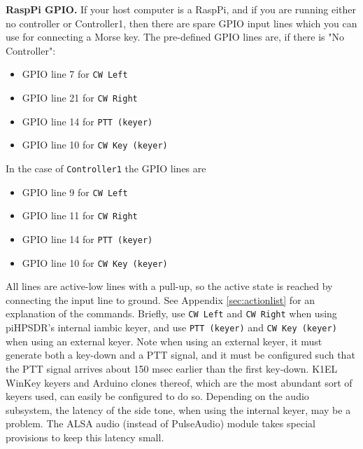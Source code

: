 \documentclass[12pt]{book}
\def\bltt#1{\texttt{\color{blue}#1}}
\begin{document}
\textbf{RaspPi GPIO.} If your host computer is a RaspPi, and if you are running either no controller
or Controller1, then there are spare GPIO input lines which you can use for connecting a Morse
key. The pre-defined GPIO lines are, if there is "No Controller":

\begin{itemize}
\item{GPIO line 7 for \bltt{CW Left}}
\item{GPIO line 21 for \bltt{CW Right}}
\item{GPIO line 14 for \bltt{PTT (keyer)}}
\item{GPIO line 10 for \bltt{CW Key (keyer)}}
\end{itemize}

In the case of \texttt{Controller1} the GPIO lines are

\begin{itemize}
\item{GPIO line 9 for \bltt{CW Left}}
\item{GPIO line 11 for \bltt{CW Right}}
\item{GPIO line 14 for \bltt{PTT (keyer)}}
\item{GPIO line 10 for \bltt{CW Key (keyer)}}
\end{itemize}

All lines are active-low lines with a pull-up, so the active state is reached
by connecting the input line to ground. See Appendix \ref{sec:actionlist} for
an explanation of the commands. Briefly, use \bltt{CW Left} and \bltt{CW Right}
when using piHPSDR's internal iambic keyer, and use \bltt{PTT (keyer)} and
\bltt{CW Key (keyer)} when using an external keyer. Note when using an external
keyer, it must generate both a key-down and a PTT signal, and it must be configured
such that the PTT signal arrives about 150 msec earlier than the first key-down.
K1EL WinKey keyers and Arduino clones thereof, which are the most abundant sort
of keyers used, can easily be configured to do so. Depending on the audio subsystem,
the latency of the side tone, when using the internal keyer, may be a problem.
The ALSA audio (instead of PulseAudio) module takes special provisions to
keep this latency small.
\end{document}
